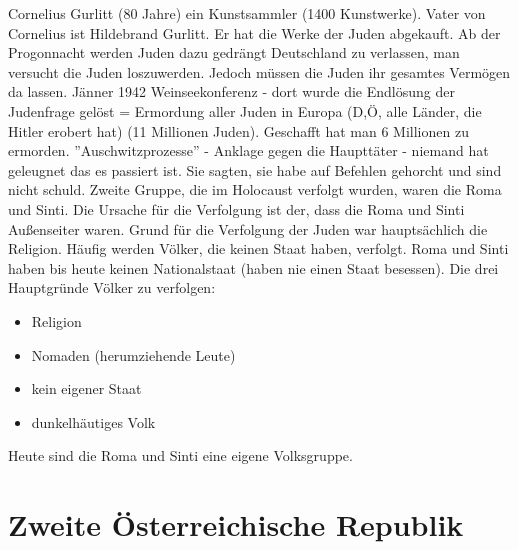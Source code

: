 \documentclass[a4paper,final]{report}
\begin{document}
\newline
\newline
Cornelius Gurlitt (80 Jahre) ein Kunstsammler (1400 Kunstwerke). Vater von Cornelius ist Hildebrand Gurlitt. Er hat die Werke der Juden abgekauft.
\newline
\newline
Ab der Progonnacht werden Juden dazu gedrängt Deutschland zu verlassen, man versucht die Juden loszuwerden. Jedoch müssen die Juden ihr gesamtes Vermögen da lassen.
\newline
\newline
Jänner 1942 Weinseekonferenz - dort wurde die Endlösung der Judenfrage gelöst = Ermordung aller Juden in Europa (D,Ö, alle Länder, die Hitler erobert hat) (11 Millionen Juden). Geschafft hat man 6 Millionen zu ermorden.
\newline
{} ''Auschwitzprozesse'' - Anklage gegen die Haupttäter - niemand hat geleugnet das es passiert ist. Sie sagten, sie habe auf Befehlen gehorcht und sind nicht schuld.
\newline
\newline
Zweite Gruppe, die im Holocaust verfolgt wurden, waren die Roma und Sinti. Die Ursache für die Verfolgung ist der, dass die Roma und Sinti Außenseiter waren. Grund für die Verfolgung der Juden war hauptsächlich die Religion. Häufig werden Völker, die keinen Staat haben, verfolgt. Roma und Sinti haben bis heute keinen Nationalstaat (haben nie einen Staat besessen).
\newline
\newline
Die drei Hauptgründe Völker zu verfolgen:
\begin{itemize}
\item Religion
\item Nomaden (herumziehende Leute)
\item kein eigener Staat
\item dunkelhäutiges Volk
\end{itemize}

Heute sind die Roma und Sinti eine eigene Volksgruppe.

\newpage

\section{Zweite Österreichische Republik}
\end{document}
